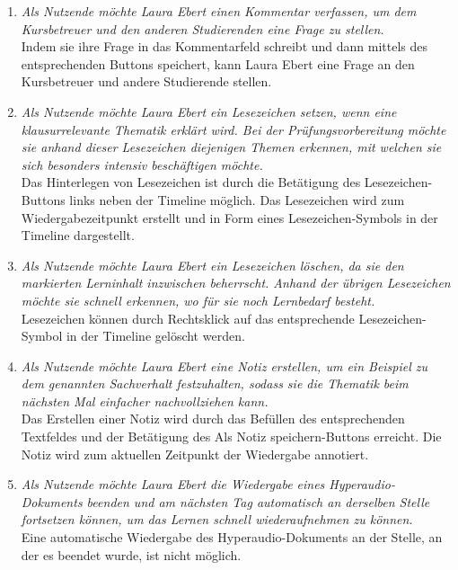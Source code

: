 \begin{enumerate}[label=US-\arabic*:,ref=US-\arabic*]
\item \label{US-Kommentar-S-Eval} \textit{Als Nutzende möchte Laura Ebert einen Kommentar verfassen, um dem Kursbetreuer und den anderen Studierenden eine Frage zu stellen.}\\
Indem sie ihre Frage in das Kommentarfeld schreibt und dann mittels des entsprechenden Buttons speichert, kann Laura Ebert eine Frage an den Kursbetreuer und andere Studierende stellen.

\item \label{US-Lesezeichen-Eval} \textit{Als Nutzende möchte Laura Ebert ein Lesezeichen setzen, wenn eine klausurrelevante Thematik erklärt wird. Bei der Prüfungsvorbereitung möchte sie anhand dieser Lesezeichen diejenigen Themen erkennen, mit welchen sie sich besonders intensiv beschäftigen möchte.}\\
Das Hinterlegen von Lesezeichen ist durch die Betätigung des Lesezeichen-Buttons links neben der Timeline möglich. Das Lesezeichen wird zum Wiedergabezeitpunkt erstellt und in Form eines Lesezeichen-Symbols in der Timeline dargestellt.

\item \label{US-Lesezeichen-Loeschen-Eval} \textit{Als Nutzende möchte Laura Ebert ein Lesezeichen löschen, da sie den markierten Lerninhalt inzwischen beherrscht. Anhand der übrigen Lesezeichen möchte sie schnell erkennen, wo für sie noch Lernbedarf besteht.}\\
Lesezeichen können durch Rechtsklick auf das entsprechende Lesezeichen-Symbol in der Timeline gelöscht werden.

\item \label{US-Notiz-S-Eval} \textit{Als Nutzende möchte Laura Ebert eine Notiz erstellen, um ein Beispiel zu dem genannten Sachverhalt festzuhalten, sodass sie die Thematik beim nächsten Mal einfacher nachvollziehen kann.}\\
Das Erstellen einer Notiz wird durch das Befüllen des entsprechenden Textfeldes und der Betätigung des \glqq Als Notiz speichern\grqq{}-Buttons erreicht. Die Notiz wird zum aktuellen Zeitpunkt der Wiedergabe annotiert.

\item \label{US-Fortsetzen-Eval} \textit{Als Nutzende möchte Laura Ebert die Wiedergabe eines Hyperaudio-Dokuments beenden und am nächsten Tag automatisch an derselben Stelle fortsetzen können, um das Lernen schnell wiederaufnehmen zu können.}\\
Eine automatische Wiedergabe des Hyperaudio-Dokuments an der Stelle, an der es beendet wurde, ist nicht möglich.


\end{enumerate}
